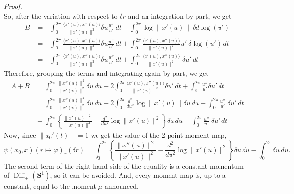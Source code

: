\documentclass[10pt,reqno,twoside]{amsart}
\DeclareMathOperator{\Diff}{Diff}
\theoremstyle{plain}
\theoremstyle{definition}
\begin{document}
\begin{proof}
\[    \]
    So,
    after the variation with respect to $\delta r$ and an integration by part,
    we get
    \begin{align*}
      {B} &= - \int_0^{2\pi} \frac{\langle x'(u), x''(u)\rangle}{\lVert x'(u)\rVert^2} \delta u \frac{u''}{u'} \, dt - \int_0^{2\pi} \log \lVert x'(u)\rVert \ \delta d \log(u') \\
      &= - \int_0^{2\pi} \frac{\langle x'(u), x''(u)\rangle}{\lVert x'(u)\rVert^2} \delta u \frac{u''}{u'} \, dt + \int_0^{2\pi} \frac{\langle x'(u), x''(u)\rangle}{\lVert x'(u)\rVert^2} u' \ \delta \log(u') \, dt \\
      &= - \int_0^{2\pi} \frac{\langle x'(u), x''(u)\rangle}{\lVert x'(u)\rVert^2} \delta u \frac{u''}{u'} \, dt + \int_0^{2\pi} \frac{\langle x'(u), x''(u)\rangle}{\lVert x'(u)\rVert^2} \ \delta u' \, dt
    \end{align*}
    Therefore,
    grouping the terms and integrating again by part,
    we get
    \begin{align*}
      {A} + B &= \int_0^{2\pi} \frac{\lVert x''(u)\rVert^2}{\lVert x'(u)\rVert^2} \delta u \, du + 2 \int_0^{2\pi} \frac{\langle x'(u), x''(u)\rangle}{\lVert x'(u)\rVert^2} \delta u' \, dt + \int_0^{2\pi} \frac{u''}{u'} \delta u' \, dt \\
      &= \int_0^{2\pi} \frac{\lVert x''(u)\rVert^2}{\lVert x'(u)\rVert^2} \delta u \, du - 2 \int_0^{2\pi} \frac{d^2}{du^2}\log\lVert x'(u)\rVert \delta u \, du + \int_0^{2\pi} \frac{u''}{u'} \ \delta u' \, dt \\
      &= \int_0^{2\pi} \left\{\frac{\lVert x''(u)\rVert^2}{\lVert x'(u)\rVert^2} - \frac{d^2}{du^2}\log\lVert x'(u)\rVert^2 \right\} \delta u \, du + \int_0^{2\pi} \frac{u''}{u'} \ \delta u' \, dt
    \end{align*}
    Now,
    since $\lVert x_0'(t)\rVert = 1$ we get the value of the 2-point moment map,
    \[
    \psi(x_0,x)(r \mapsto \varphi)_r(\delta r) = \int_0^{2\pi} \left\{\frac{\lVert x''(u)\rVert^2}{\lVert x'(u)\rVert^2} - \frac{d^2}{du^2}\log\lVert x'(u)\rVert^2 \right\} \delta u \, du - \int_0^{2\pi} \delta u \, du.
    \]
    The second term of the right hand side of the equality is a constant momentum of $\Diff_+(\mathbf{S}^1)$,
    so it can be avoided.
    And,
    every moment map is,
    up to a constant,
    equal to the moment $\mu$ announced.
    

\end{proof}
\end{document}
